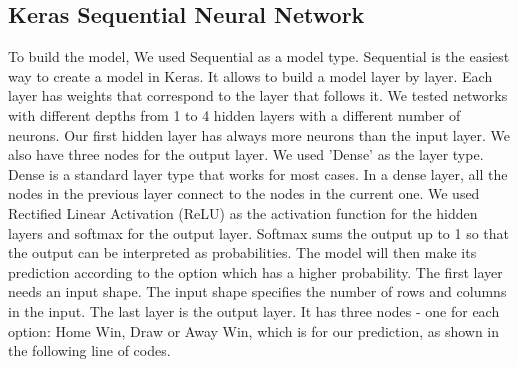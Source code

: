 \subsection{Keras Sequential Neural Network}

To build the model, We used Sequential as a model type. Sequential is the easiest way to create a model in Keras. It allows to build a model layer by layer. Each layer has weights that correspond to the layer that follows it. \newline \newline %
We tested networks with different depths from 1 to 4 hidden layers with a different number of neurons. Our first hidden layer has always more neurons than the input layer. We also have three nodes for the output layer.\newline \newline
We used 'Dense' as the layer type. Dense is a standard layer type that works for most cases. In a dense layer, all the nodes in the previous layer connect to the nodes in the current one.\newline \newline
We used Rectified Linear Activation (ReLU) as the activation function for the hidden layers and softmax for the output layer. Softmax sums the output up to 1 so that the output can be interpreted as probabilities. The model will then make its prediction according to the option which has a higher probability.\newline \newline
The first layer needs an input shape. The input shape specifies the number of rows and columns in the input.\newline
The last layer is the output layer. It has three nodes - one for each option: Home Win, Draw or Away Win, which is for our prediction, as shown in the following line of codes.\newline \newline \newline \newline \newline

